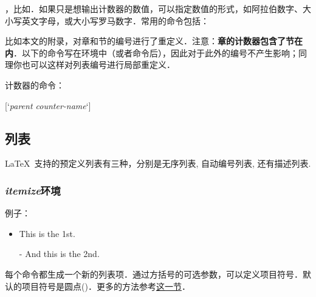 ，比如．如果只是想输出计数器的数值，可以指定数值的形式，如阿拉伯数字、大小写英文字母，或大小写罗马数字．常用的命令包括：
\begin{latex}
\Alph \alph \Roman \roman
\end{latex}

比如本文的附录，对章和节的编号进行了重定义．注意：\textbf{章的计数器包含了节在内}．以下的命令写在环境中（或者命令后），因此对于此外的编号不产生影响；同理你也可以这样对列表编号进行局部重定义．
\begin{latex}
\renewcommand{\thechapter}{\Alph{chapter}}
\renewcommand{\thesection}
    {\thechapter-\arabic{section}}
\renewcommand{\thefootnote}{[\arabic{footnote}]}
\end{latex}

计数器的命令：
\begin{latex}
[`\textit{parent counter-name}`]
\end{latex}

\subsection{列表}
\LaTeX\ 支持的预定义列表有三种，分别是无序列表, 自动编号列表, 还有描述列表.

\subsubsection{\textit{itemize}环境}
例子：

\begin{codeshow}
\begin{itemize}
  \item This is the 1st.
  \item[-] And this is the 2nd.
\end{itemize}
\end{codeshow}

每个命令都生成一个新的列表项．通过方括号的可选参数，可以定义项目符号．默认的项目符号是圆点()．更多的方法参考\hyperref[sec:list]{这一节}．

